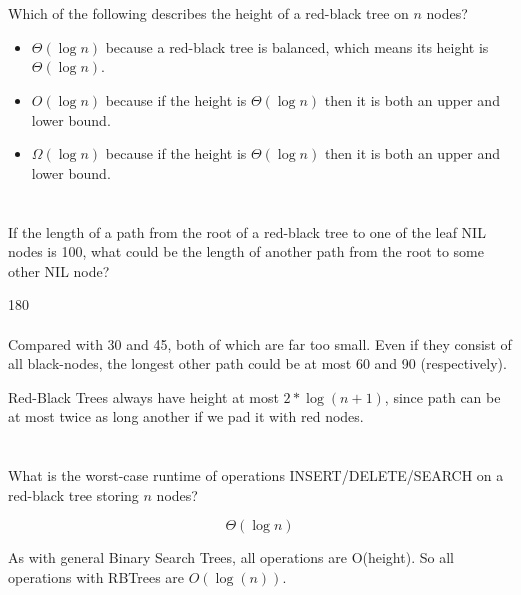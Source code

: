 \documentclass [12pt]{article}
\begin{document}
\section{} Which of the following describes the height of a red-black tree on $n$ nodes?

\begin{Solution}
\begin{itemize}
    \item $\Theta(\log n)$ because a red-black tree is balanced, which means its height is $\Theta(\log n)$.
    \item $O(\log n)$ because if the height is $\Theta(\log n)$ then it is both an upper and lower bound.
    \item $\Omega(\log n)$ because if the height is $\Theta(\log n)$ then it is both an upper and lower bound.
\end{itemize}
\end{Solution}


\section{} If the length of a path from the root of a red-black tree to one of the leaf NIL nodes is 100, what could be the length of another path from the root to some other NIL node?

\begin{Solution}
180
\paragraph{}
Compared with 30 and 45, both of which are far too small. Even if they consist of all black-nodes, the longest other path could be at most 60 and 90 (respectively).

Red-Black Trees always have height at most $2*\log(n+1)$, since path can be at most twice as long another if we pad it with red nodes.
\end{Solution}


\section{} What is the worst-case runtime of operations INSERT/DELETE/SEARCH on a red-black tree storing $n$ nodes?

\begin{Solution}
$$\Theta(\log n)$$

As with general Binary Search Trees, all operations are O(height). So all operations with RBTrees are $O(\log(n))$.
\end{Solution}
\end{document}
